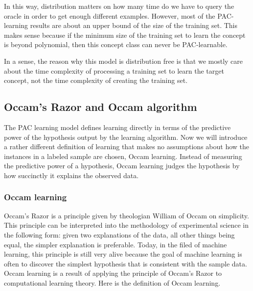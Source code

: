\documentclass[12pt]{article}
\begin{document}
\begin{enumerate}
    In this way, distribution matters on how many time do we have to query the oracle in order to get enough different examples. However, most of the PAC-learning results are about an upper bound of the size of the training set. This makes sense because if the minimum size of the training set to learn the concept is beyond polynomial, then this concept class can never be PAC-learnable.

    In a sense, the reason why this model is distribution free is that we mostly care about the time complexity of processing a training set to learn the target concept, not the time complexity of creating the training set.

\end{enumerate}

\subsection{Occam's Razor and Occam algorithm}


The PAC learning model defines learning directly in terms of the predictive power of the hypothesis output by the learning algorithm. Now we will introduce a rather different definition of learning that makes no assumptions about how the instances in a labeled sample are chosen, Occam learning. Instead of measuring the predictive power of a hypothesis, Occam learning judges the hypothesis by how succinctly it explains the observed data. 

\subsubsection{Occam learning}

Occam's Razor is a principle given by theologian William of Occam on simplicity. This principle can be interpreted into the methodology of experimental science in the following form: given two explanations of the data, all other things being equal, the simpler explanation is preferable. Today, in the filed of machine learning, this principle is still very alive because the goal of machine learning is often to discover the simplest hypothesis that is consistent with the sample data. \\

Occam learning is a result of applying the principle of Occam's Razor to computational learning theory. Here is the definition of Occam learning.
\end{document}
